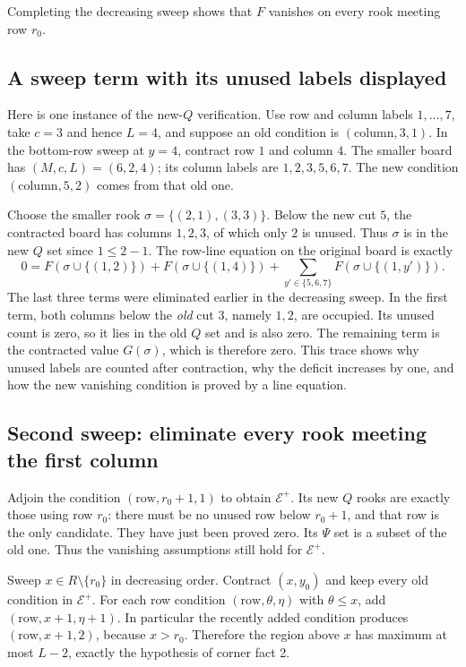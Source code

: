 Completing the decreasing sweep shows that $F$ vanishes on every rook meeting row $r_0$.

\subsection{A sweep term with its unused labels displayed}
Here is one instance of the new-$Q$ verification. Use row and column
labels $1,\ldots,7$, take $c=3$ and hence $L=4$, and suppose an old
condition is $(\mathrm{column},3,1)$. In the bottom-row sweep at
$y=4$, contract row $1$ and column $4$. The smaller board has
$(M,c,L)=(6,2,4)$; its column labels are $1,2,3,5,6,7$.
The new condition $(\mathrm{column},5,2)$ comes from that old one.

Choose the smaller rook $\sigma=\{(2,1),(3,3)\}$. Below the new cut
$5$, the contracted board has columns $1,2,3$, of which only $2$
is unused. Thus $\sigma$ is in the new $Q$ set since $1\le2-1$.
The row-line equation on the original board is exactly
\[
 0=F(\sigma\cup\{(1,2)\})+F(\sigma\cup\{(1,4)\})
       +\sum_{y'\in\{5,6,7\}}F(\sigma\cup\{(1,y')\}).
\]
The last three terms were eliminated earlier in the decreasing sweep.
In the first term, both columns below the \emph{old} cut $3$, namely
$1,2$, are occupied. Its unused count is zero, so it lies in the old
$Q$ set and is also zero. The remaining term is the contracted value
$G(\sigma)$, which is therefore zero. This trace shows why unused
labels are counted after contraction, why the deficit increases by one,
and how the new vanishing condition is proved by a line equation.

\subsection{Second sweep: eliminate every rook meeting the first column}
Adjoin the condition $(\mathrm{row},r_0+1,1)$ to obtain $\mathcal E^+$. Its new $Q$ rooks are exactly those using row $r_0$: there must be no unused row below $r_0+1$, and that row is the only candidate. They have just been proved zero. Its $\Psi$ set is a subset of the old one. Thus the vanishing assumptions still hold for $\mathcal E^+$.

Sweep $x\in R\setminus\{r_0\}$ in decreasing order. Contract $(x,y_0)$ and keep every old condition in $\mathcal E^+$. For each row condition $(\mathrm{row},\theta,\eta)$ with $\theta\le x$, add $(\mathrm{row},x+1,\eta+1)$. In particular the recently added condition produces $(\mathrm{row},x+1,2)$, because $x>r_0$. Therefore the region above $x$ has maximum at most $L-2$, exactly the hypothesis of corner fact 2.

